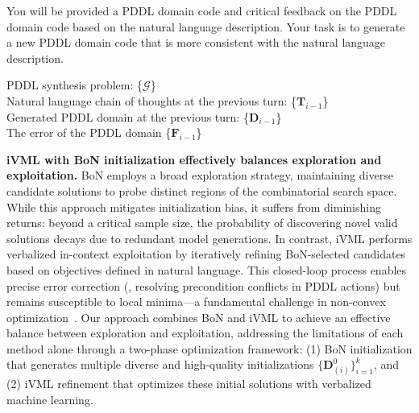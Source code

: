 \begin{tcolorbox}[title = {Prompt template for $f_\mathrm{update}(\cdot)$},
  fonttitle = \bfseries, fontupper = \sffamily\small, fontlower = \sffamily\small, colframe=c1, colback=green2!5]
You will be provided a PDDL domain code and critical feedback on the PDDL domain code based on the natural language description.
Your task is to generate a new PDDL domain code that is more consistent with the natural language description.

PDDL synthesis problem: \{$\mathcal{G}$\}\\
Natural language chain of thoughts at the previous turn: \{$\mathbf{T}_{i-1}$\}\\
Generated PDDL domain at the previous turn: \{$\mathbf{D}_{i-1}$\}\\
The error of the PDDL domain \{$\mathbf{F}_{i-1}$\}

\end{tcolorbox}
\textbf{iVML with BoN initialization effectively balances exploration and exploitation.}
BoN employs a broad exploration strategy, maintaining diverse candidate solutions to probe distinct regions of the combinatorial search space. While this approach mitigates initialization bias, it suffers from diminishing returns: beyond a critical sample size, the probability of discovering novel valid solutions decays due to redundant model generations.
In contrast, iVML performs verbalized in-context exploitation by iteratively refining BoN-selected candidates based on objectives defined in natural language. This closed-loop process enables precise error correction (\eg, resolving precondition conflicts in PDDL actions) but remains susceptible to local minima—a fundamental challenge in non-convex optimization~\cite{sharony2024learning}.
Our approach combines BoN and iVML to achieve an effective balance between exploration and exploitation, addressing the limitations of each method alone through a two-phase optimization framework:
(1) BoN initialization that generates multiple diverse and high-quality initializations $\{\mathbf{D}_{(i)}^{0}\}_{i=1}^k$, and 
(2) iVML refinement that optimizes these initial solutions with verbalized machine learning. 








